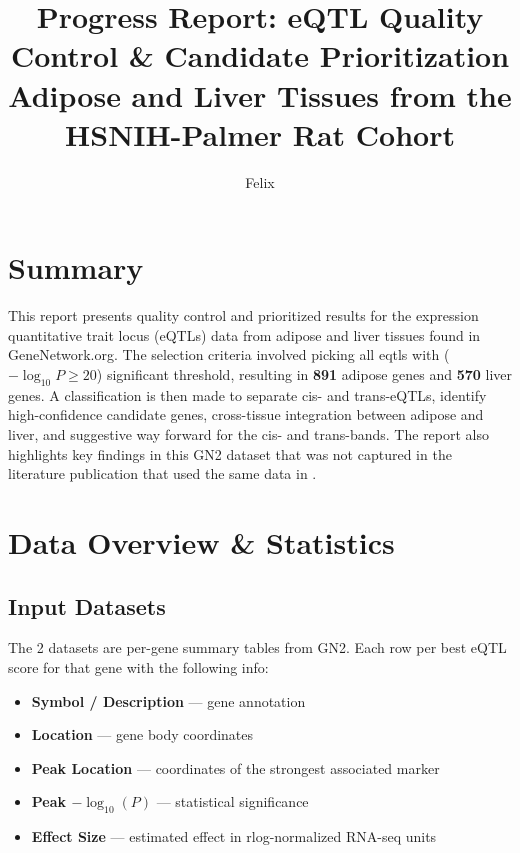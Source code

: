\documentclass[11pt,a4paper]{article}
\title{\textbf{Progress Report: eQTL Quality Control \& Candidate Prioritization} \\ \large Adipose and Liver Tissues from the HSNIH-Palmer Rat Cohort}
\author{Felix}
\begin{document}
\maketitle

\section*{Summary}
This report presents quality control and prioritized results for the expression quantitative trait locus (eQTLs) data from adipose and liver tissues found in GeneNetwork.org. The selection criteria involved picking all eqtls with ($-\log_{10}P \geq 20$) significant threshold, resulting in \textbf{891} adipose genes and \textbf{570} liver genes. A classification is then made to separate cis- and trans-eQTLs, identify high-confidence candidate genes, cross-tissue integration between adipose and liver, and suggestive way forward for the cis- and trans-bands. The report also highlights key findings in this GN2 dataset that was not captured in the literature publication that used the same data in \cite{hongle2023}. 

\section{Data Overview \& Statistics} 
\subsection{Input Datasets} 
The 2 datasets are per-gene summary tables from GN2. Each row per best eQTL score for that gene with the following info:
\begin{itemize}
    \item \textbf{Symbol / Description} — gene annotation
    \item \textbf{Location} — gene body coordinates
    \item \textbf{Peak Location} — coordinates of the strongest associated marker
    \item \textbf{Peak $-\log_{10}(P)$} — statistical significance
    \item \textbf{Effect Size} — estimated effect in rlog-normalized RNA-seq units
\end{itemize}
\end{document}
